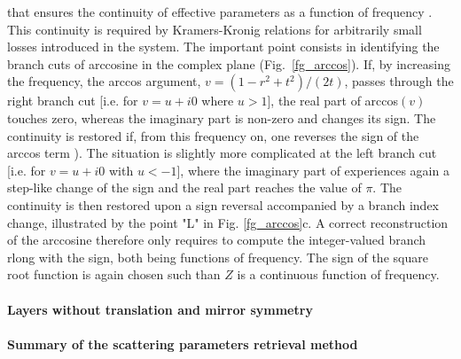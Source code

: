 that ensures the continuity of effective parameters as a function of frequency . This continuity is required by Kramers-Kronig relations for arbitrarily small losses introduced in the system. The important point consists in identifying the branch cuts of arccosine in the complex plane (Fig.\ \ref{fg_arccos}). If, by increasing the frequency, the arccos argument, $v = (1 - r^2+t^2)/(2 t)$, passes through the right branch cut [i.e.  for $v= u+i 0$ where $u>1$], the real part of arccos$(v)$ touches zero, whereas the imaginary part is non-zero and changes its sign. The continuity is restored if, from this frequency on, one reverses the sign of the arccos term ). The situation is slightly more complicated at the left branch cut [i.e. for $v = u+i 0$ with $u<-1$], where the imaginary part of  experiences again a step-like change of the sign and the real part reaches the value of $\pi$. The continuity is then restored upon a sign reversal accompanied by a branch index change,  illustrated by the point "L" in Fig. \ref{fg_arccos}c. A correct reconstruction of the arccosine therefore only requires to compute the integer-valued branch rlong with the sign, both being functions of frequency. The sign of the square root function is again chosen such than $Z$ is a continuous function of frequency.  

\paragraph{Layers without translation and mirror symmetry} %


\paragraph{Summary of the scattering parameters retrieval method} %


